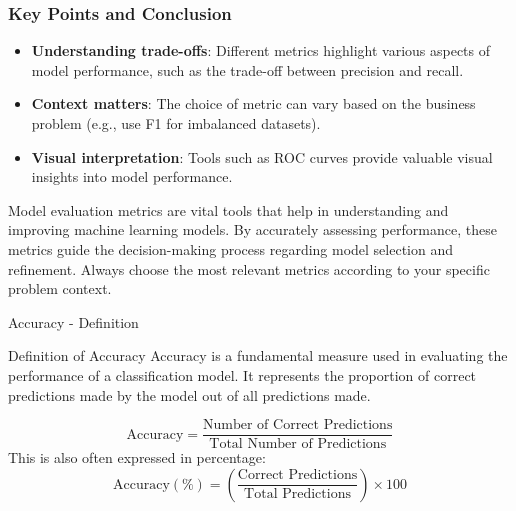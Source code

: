 \documentclass[aspectratio=169]{beamer}
\begin{document}
\begin{frame}[fragile]
    \frametitle{Key Points and Conclusion}
    \begin{itemize}
        \item \textbf{Understanding trade-offs}: Different metrics highlight various aspects of model performance, such as the trade-off between precision and recall.
        \item \textbf{Context matters}: The choice of metric can vary based on the business problem (e.g., use F1 for imbalanced datasets).
        \item \textbf{Visual interpretation}: Tools such as ROC curves provide valuable visual insights into model performance.
    \end{itemize}
    
    Model evaluation metrics are vital tools that help in understanding and improving machine learning models. By accurately assessing performance, these metrics guide the decision-making process regarding model selection and refinement. Always choose the most relevant metrics according to your specific problem context.
\end{frame}

\begin{frame}[fragile]{Accuracy - Definition}
    \begin{block}{Definition of Accuracy}
        Accuracy is a fundamental measure used in evaluating the performance of a classification model. It represents the proportion of correct predictions made by the model out of all predictions made.
    \end{block}
    \begin{equation}
        \text{Accuracy} = \frac{\text{Number of Correct Predictions}}{\text{Total Number of Predictions}}
    \end{equation}
    This is also often expressed in percentage:
    \begin{equation}
        \text{Accuracy} (\%) = \left( \frac{\text{Correct Predictions}}{\text{Total Predictions}} \right) \times 100
    \end{equation}
\end{frame}
\end{document}
